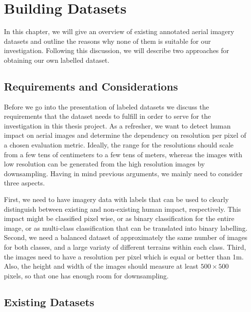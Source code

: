 
\chapter{Building Datasets} %

\label{Chapter2} %


In this chapter, we will give an overview of existing annotated aerial imagery datasets and outline the reasons why none of them is suitable for our investigation. Following this discussion, we will describe two approaches for obtaining our own labelled dataset.

\section{Requirements and Considerations}

Before we go into the presentation of labeled datasets we discuss the requirements that the dataset needs to fulfill in order to serve for the investigation in this thesis project. As a refresher, we want to detect human impact on aerial images and determine the dependency on resolution per pixel of a chosen evaluation metric. Ideally, the range for the resolutions should scale from a few tens of centimeters to a few tens of meters, whereas the images with low resolution can be generated from the high resolution images by downsampling. Having in mind previous arguments, we mainly need to consider three aspects. 

First, we need to have imagery data with labels that can be used to clearly distinguish between existing and non-existing human impact, respectively. This impact might be classified pixel wise, or as binary classification for the entire image, or as multi-class classification that can be translated into binary labelling. Second, we need a balanced dataset of approximately the same number of images for both classes, and a large variaty of different terrains within each class. Third, the images need to have a resolution per pixel which is equal or better than 1m. Also, the height and width of the images should measure at least $500\times500$ pixels, so that one has enough room for downsampling. 

\section{Existing Datasets}

